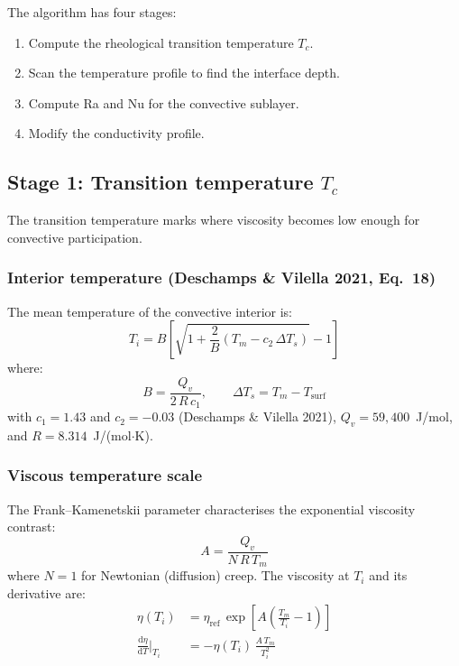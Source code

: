 \documentclass[11pt,a4paper]{article}
\newcommand{\dd}{\mathrm{d}}
\begin{document}
The algorithm has four stages:
\begin{enumerate}[leftmargin=2em]
\item Compute the rheological transition temperature $T_c$.
\item Scan the temperature profile to find the interface depth.
\item Compute Ra and Nu for the convective sublayer.
\item Modify the conductivity profile.
\end{enumerate}

\subsection{Stage 1: Transition temperature $T_c$}

The transition temperature marks where viscosity becomes low enough
for convective participation.

\subsubsection{Interior temperature (Deschamps \& Vilella 2021, Eq.~18)}

The mean temperature of the convective interior is:
\begin{equation}
T_i = B\left[\sqrt{1 + \frac{2}{B}\left(T_m - c_2\,\Delta T_s\right)} - 1\right]
\label{eq:Ti}
\end{equation}
where:
\begin{equation}
B = \frac{Q_v}{2\,R\,c_1}, \qquad
\Delta T_s = T_m - T_{\mathrm{surf}}
\end{equation}
with $c_1 = 1.43$ and $c_2 = -0.03$ (Deschamps \& Vilella 2021),
$Q_v = 59{,}400$~J/mol, and $R = 8.314$~J/(mol$\cdot$K).

\subsubsection{Viscous temperature scale}

The Frank--Kamenetskii parameter characterises the exponential viscosity
contrast:
\begin{equation}
A = \frac{Q_v}{N\,R\,T_m}
\end{equation}
where $N = 1$ for Newtonian (diffusion) creep. The viscosity at $T_i$
and its derivative are:
\begin{align}
\eta(T_i) &= \eta_{\mathrm{ref}}\,\exp\!\left[A\left(\frac{T_m}{T_i} - 1\right)\right]
\label{eq:eta_Ti} \\
\frac{\dd\eta}{\dd T}\bigg|_{T_i} &= -\eta(T_i)\,\frac{A\,T_m}{T_i^2}
\label{eq:deta}
\end{align}
\end{document}
